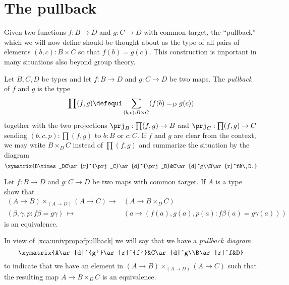 \section{The pullback}
\label{sec:pullback}
Given two functions $f:B\to D$ and $g:C\to D$ with common target, the ``pullback'' which we will now define should be thought about as the type of all pairs of elements $(b,c):B\times C$ so that $f(b)=g(c)$.  This construction is important in many situations also beyond group theory.

\begin{definition}
  \label{def:pullback}
  Let $B, C, D$ be types and let $f:B\to D$ and $g:C\to D$ be two maps.
The \emph{pullback} of $f$ and $g$ is the type
$$\prod(f,g)\defequi\sum_{(b,c):B\times C}(f(b)=_Dg(c))$$
together with the two projections $\prj_B:\prod(f,g)\to B$ and $\prj_C:\prod(f,g)\to C$ sending $(b,c,p):\prod(f,g)$ to $b:B$ or $c:C$.  If $f$ and $g$ are clear from the context, we may write $B\times_DC$ instead of $\prod(f,g)$ and summarize the situation by the diagram
$$\xymatrix{B\times_DC\ar[r]^{\prj_C}\ar[d]^{\prj_B}&C\ar[d]^g\\B\ar[r]^f&\,D.}$$
\end{definition}
\begin{xca}
  \label{xca:univpropofpullback}
  Let $f:B\to D$ and $g:C\to D$ be two maps with common target.  If $A$ is a type show that
  \begin{align*}
    (A\to B)\times_{(A\to D)}(A\to C)\to &(A\to B\times_DC)\\
(\beta,\gamma,p:f\beta=g\gamma)\,\mapsto\,&(a\mapsto (f(a),g(a),p(a):f\beta(a)=g\gamma(a)))
  \end{align*}
 is an equivalence.
\end{xca}
In view of \cref{xca:univpropofpullback} we will say that we have a \emph{pullback diagram}
$$\xymatrix{A\ar[d]^{g'}\ar[r]^{f'}&C\ar[d]^g\\B\ar[r]^f&D}$$
to indicate that we have an element in $(A\to B)\times_{(A\to D)}(A\to C)$ such that the resulting map $A\to B\times_DC$ is an equivalence.

